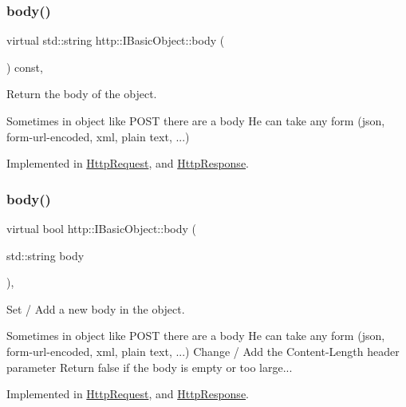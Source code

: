 \subsubsection{\texorpdfstring{body()}{body()}\hspace{0.1cm}{\footnotesize\ttfamily [1/2]}}
{\footnotesize\ttfamily virtual std\+::string http\+::\+I\+Basic\+Object\+::body (\begin{DoxyParamCaption}{ }\end{DoxyParamCaption}) const\hspace{0.3cm}{\ttfamily [pure virtual]}, {\ttfamily [noexcept]}}



Return the body of the object. 

Sometimes in object like P\+O\+ST there are a body He can take any form (json, form-\/url-\/encoded, xml, plain text, ...) 

Implemented in \hyperlink{classHttpRequest_a16be46a53c2d2f8d29ad89aa213f30bb}{Http\+Request}, and \hyperlink{classHttpResponse_a696715c993a4ec50a609efcd43d98a62}{Http\+Response}.

\mbox{\label{structhttp_1_1IBasicObject_aa304f3a3137912f1dbff798531fa4c09}} 
\subsubsection{\texorpdfstring{body()}{body()}\hspace{0.1cm}{\footnotesize\ttfamily [2/2]}}
{\footnotesize\ttfamily virtual bool http\+::\+I\+Basic\+Object\+::body (\begin{DoxyParamCaption}\item[{std\+::string}]{body }\end{DoxyParamCaption})\hspace{0.3cm}{\ttfamily [pure virtual]}, {\ttfamily [noexcept]}}



Set / Add a new body in the object. 

Sometimes in object like P\+O\+ST there are a body He can take any form (json, form-\/url-\/encoded, xml, plain text, ...) Change / Add the \textquotesingle{}Content-\/\+Length\textquotesingle{} header parameter Return false if the body is empty or too large... 

Implemented in \hyperlink{classHttpRequest_a591fb5ec9430764ed5b3578d49c3858f}{Http\+Request}, and \hyperlink{classHttpResponse_a26f66b018b250a0ee37859730e131404}{Http\+Response}.

